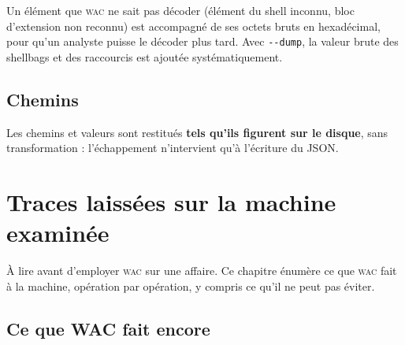 \documentclass[11pt,a4paper,oneside]{report}
\newcommand{\wac}{\textsc{wac}}
\newcommand{\opt}[1]{\texttt{-{}-#1}}
\begin{document}
Un élément que \wac{} ne sait pas décoder (élément du shell inconnu, bloc
d'extension non reconnu) est accompagné de ses octets bruts en hexadécimal, pour
qu'un analyste puisse le décoder plus tard. Avec \opt{dump}, la valeur brute des
shellbags et des raccourcis est ajoutée systématiquement.

\section{Chemins}

Les chemins et valeurs sont restitués \textbf{tels qu'ils figurent sur le
disque}, sans transformation : l'échappement n'intervient qu'à l'écriture du
JSON.

\chapter{Traces laissées sur la machine examinée}\label{chap:traces}

À lire avant d'employer \wac{} sur une affaire. Ce chapitre énumère ce que \wac{}
fait à la machine, opération par opération, y compris ce qu'il ne peut pas
éviter.

\section{Ce que WAC fait encore}
\end{document}
